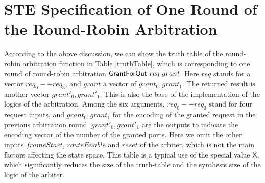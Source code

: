 \documentclass[final]{IEEEtran}
\begin{document}
\section{STE Specification of One Round of the Round-Robin Arbitration}
\label{sec:STESpecRoundRobin}
 According to the above discussion, we
can show the truth table of the round-robin arbitration function in
Table \ref{truthTable},
which is corresponding to one round of round-robin arbitration $\mathsf{%
GrantForOut}\ req \ grant$. Here $req$ stands for a vector
$req_0--req_3$, and $grant$ a vector of $grant_0,grant_1$. The
returned result is another vector $grant'_0, grant'_1$. This is also
the base of the implementation of the logics
 of the arbitration.
Among the %
six arguments, $%
req_0--req_3$ stand for four request inputs, and $grant_0, grant_1$ for the
encoding of the granted request in the previous arbitration round. $%
grant'_0, grant'_1$ are the outputs to indicate the
encoding vector of the number of the granted ports. Here we omit the
other inputs $frameStart$, $routeEnable$ and $reset$  of the
arbiter, which is not the main factors affecting the state space.
This table is a typical use of the special value $\mathsf{X}$, which
significantly reduces the size of the truth-table and the synthesis
size of the logic of the arbiter.
\end{document}
